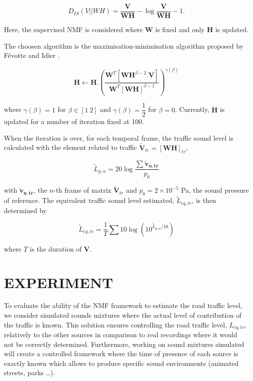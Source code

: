 \documentclass{article}
\begin{document}
\begin{sloppy}
\begin{equation}\label{eq:divIS}
D_{IS}(V\vert\vert WH) = \frac{\mathbf{V}}{\mathbf{WH}} -\log\frac{\mathbf{V}}{\mathbf{WH}}-1.
\end{equation}

Here, the supervised NMF is considered where $\mathbf{W}$ is fixed and only $\mathbf{H}$ is updated.

The choosen algorithm is the maximisation-minimisation algorithm proposed by F\'{e}votte and Idier \cite{fevotte2011}.

\begin{equation}
\mathbf{H} \longleftarrow \mathbf{H}.\left(\frac{\mathbf{W}^T\left[\mathbf{WH}^{\beta-2}.\mathbf{V} \right]}{\mathbf{W}^T \left[ \mathbf{WH} \right]^{\beta-1}}\right)^{\gamma(\beta)}
\end{equation}

where $\gamma(\beta) = 1$ for $\beta \in [1~2]$ and $\gamma(\beta) = \dfrac{1}{2}$ for $\beta = 0$. Currently, $\mathbf{H}$ is updated for a number of iteration fixed at 100.

When the iteration is over, for each temporal frame, the traffic sound level is calculated with the element related to traffic $\mathbf{\tilde{V}}_{tr} = \left[\mathbf{WH}\right]_{tr}$,

\begin{equation}\label{eq:Lp}
\tilde{L}_{p,n} = 20\log\frac{\sum\mathbf{\mathbf{\tilde{v}}_{\mathbf{n},tr}}}{p_{0}}
\end{equation}

with $\mathbf{\tilde{v}_{n,tr}}$, the $n$-th frame of matrix $\mathbf{\tilde{V}}_{tr}$ and $ p_{0} = 2\times 10^{-5}$ Pa, the sound pressure of reference. The equivalent traffic sound level estimated, $\tilde{L}_{eq,tr}$, is then determined by

\begin{equation}\label{eq:Leq}
\tilde{L}_{eq,tr} = \frac{1}{T} \sum 10\log \left(10^{\tilde{L}_{p,n}/10}\right)
\end{equation}

where $T$ is the duration of $\mathbf{V}$.\\

\section{EXPERIMENT}\label{sec:experiment}

To evaluate the ability of the NMF framework to estimate the road traffic level, we consider simulated sounds mixtures where the actual level of contribution of the traffic is known. This solution ensures controlling the road traffic level, $L_{eq,tr}$, relatively to the other sources in comparison to real recordings where it would not be correctly determined. Furthermore, working on sound mixtures simulated will create a controlled framework where the time of presence of each source is exactly known which allows to produce specific sound environments (animated streets, parks \dots). 


\end{sloppy}
\end{document}
